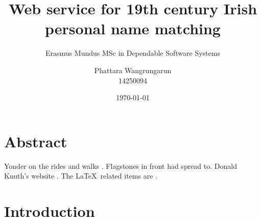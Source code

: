 \documentclass[a4paper, 11pt]{scrartcl}
\begin{document}
\title{Web service for 19th century Irish personal name matching}
\author{Phattara Wangrungarun\\14250094}
\subtitle{Erasmus Mundus MSc in Dependable Software Systems}
\date{\small\today}
\maketitle

\tableofcontents

\section*{Abstract}

Yonder on the rides and walks \citet{einstein}.
Flagstones in front had spread to.
Donald Knuth's website \cite{knuthwebsite}.
The \LaTeX\ related items are
\cite{latexcompanion,knuthwebsite}.

\section{Introduction}


\end{document}
